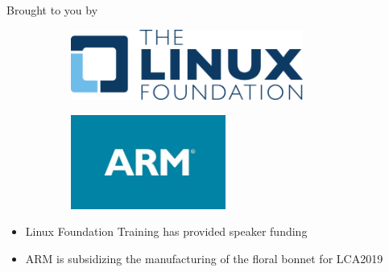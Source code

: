 \begin{frame}
	{Brought to you by}
	\begin{figure}[H]
		\centering
		\begin{subfigure}{0.4\textwidth}
			\centering
			\includegraphics[width=3in]{IMAGES/LF-logo}
		\end{subfigure}
		\begin{subfigure}{0.4\textwidth}
			\centering
			\includegraphics[width=2in]{IMAGES/ARM-logo}
		\end{subfigure}
	\end{figure}
	\begin{itemize}
		\item Linux Foundation Training has provided speaker funding
		\item ARM is subsidizing the manufacturing of the floral bonnet for LCA2019
	\end{itemize}
\end{frame}

\cprotect{}

